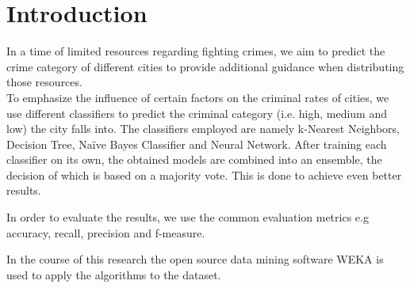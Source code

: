\section{Introduction}

In a time of limited resources regarding fighting crimes, we aim to predict the crime category of different
cities to provide additional guidance when distributing those resources. \\

\noindent To emphasize the influence of certain factors on the criminal rates of cities, we use different
classifiers to predict the criminal category (i.e. high, medium and low) the city falls into. The classifiers
employed are namely k-Nearest Neighbors, Decision Tree, Na\"ive Bayes Classifier and Neural Network.
After training each classifier on its own, the obtained models are combined into an ensemble, the decision of
which is based on a majority vote. This is done to achieve even better results. 

In order to evaluate the results, we use the common evaluation metrics e.g accuracy, recall, precision and
f-measure.

In the course of this research the open source data mining software WEKA is used to apply the algorithms to
the dataset.

\vspace*{\fill}
